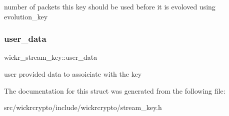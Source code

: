 number of packets this key should be used before it is evoloved using \textquotesingle{}evolution\+\_\+key\textquotesingle{} \mbox{\label{structwickr__stream__key_a51e59da9f7fbb0b3e1332a20252d1cc6}} 
\subsubsection{\texorpdfstring{user\+\_\+data}{user\_data}}
{\footnotesize\ttfamily wickr\+\_\+stream\+\_\+key\+::user\+\_\+data}

user provided data to assoiciate with the key 

The documentation for this struct was generated from the following file\+:\begin{DoxyCompactItemize}
\item 
src/wickrcrypto/include/wickrcrypto/stream\+\_\+key.\+h\end{DoxyCompactItemize}
